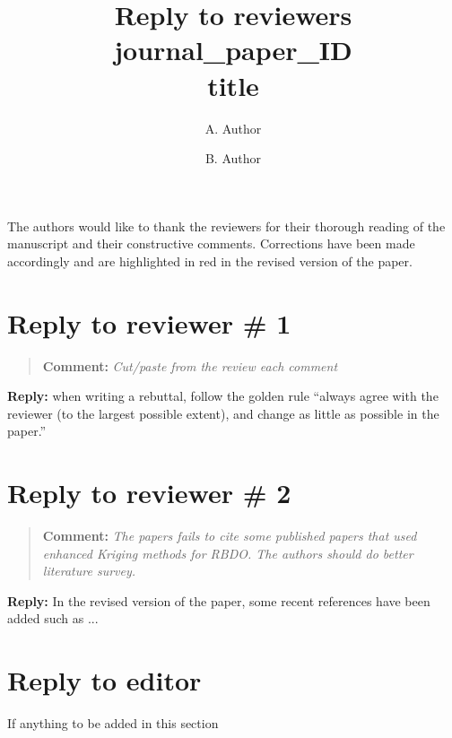 \documentclass[a4paper,11pt]{article}              %
\newcommand{\revcomment}[1]{
  \begin{quotation}
    {\small
   \noindent   \textbf{Comment:}
   \em #1
    }    
  \end{quotation}
}
\newcommand{\reply}[1]
{
 \noindent   \textbf{Reply:}
#1}
\begin{document}
\title{Reply to reviewers\\
	journal\_paper\_ID\\
	\textbf{title}} 

\author[1]{A. Author} \author[1]{B. Author}


\date{}
\maketitle


The authors would like to thank the reviewers for their thorough reading
of the manuscript and their constructive comments. Corrections have been
made accordingly and are highlighted in red in the revised version of
the paper.

\section{Reply to reviewer \# 1}
%	

\revcomment{Cut/paste from the review each comment}

\reply{when writing a rebuttal, follow the golden rule ``always agree
  with the reviewer (to the largest possible extent), and change as
  little as possible in the paper.''}


\section{Reply to reviewer \# 2}
\revcomment{The papers fails to cite some published papers that used
  enhanced Kriging methods for RBDO. The authors should do better
  literature survey.}

\reply{In the revised version of the paper, some recent references have
  been added such as ...}



\section{Reply to editor}
If anything to be added in this section 



\nocite{SudretHDR}

\renewcommand{\refname}{Additional references}
\small


\end{document}
